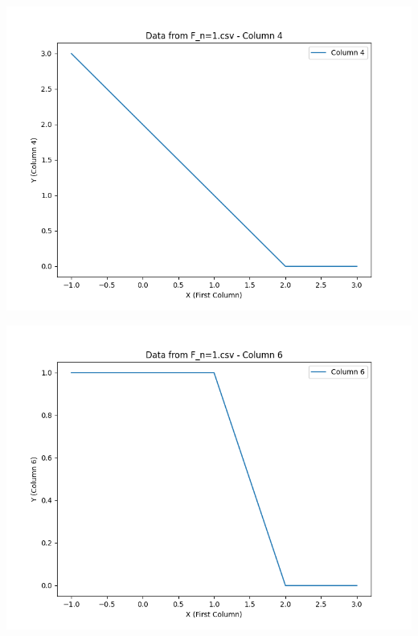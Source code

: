 \documentclass[UTF8]{ctexart}
\begin{document}
\noindent %
\begin{minipage}{0.3\textwidth}
	\includegraphics[width=\linewidth]{../figure/F_n=1.csv_Column_4.png} %
\end{minipage}
\hspace{1em} %
\begin{minipage}{0.3\textwidth}
	\includegraphics[width=\linewidth]{../figure/F_n=1.csv_Column_6.png} %
\end{minipage}
\hspace{1em} %
\end{document}
